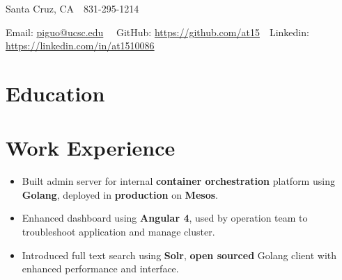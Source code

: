\documentclass[11pt, letterpaper]{simple-cv}
\begin{document}
\centerline{
Santa Cruz, CA\ \
831-295-1214\ \
}
\centerline{
Email: \href{mailto:piguo@ucsc.edu}{piguo@ucsc.edu}\ \
GitHub: \href{https://github.com/at15}{https://github.com/at15}\ \
Linkedin: \href{https://www.linkedin.com/in/at1510086}{https://linkedin.com/in/at1510086}}

\section{Education}

\section{Work Experience}

\begin{itemize}
\item Built admin server for internal \textbf{container orchestration} platform using \textbf{Golang}, deployed in \textbf{production} on \textbf{Mesos}.
\item Enhanced dashboard using \textbf{Angular 4}, used by operation team to troubleshoot application and manage cluster.
\item Introduced full text search using \textbf{Solr}, \textbf{open sourced} Golang client with enhanced performance and interface.
\end{itemize}

\end{document}

